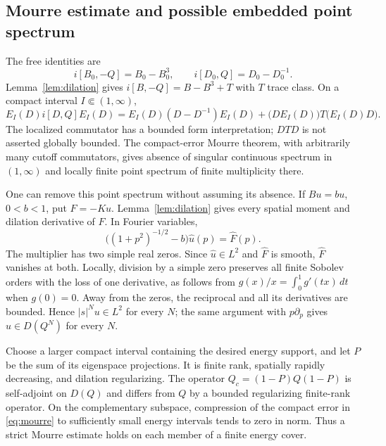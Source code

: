 \documentclass[11pt]{amsart}
\numberwithin{equation}{section}
\theoremstyle{remark}
\begin{document}
\subsection{Mourre estimate and possible embedded point spectrum}
The free identities are
\begin{equation}\label{eq:freecomm}
i[B_0,-Q]=B_0-B_0^3,\qquad i[D_0,Q]=D_0-D_0^{-1} .
\end{equation}
Lemma~\ref{lem:dilation} gives $i[B,-Q]=B-B^3+T$ with $T$ trace class. On a compact interval $I\Subset(1,\infty)$,
\begin{equation}\label{eq:mourre}
E_I(D)i[D,Q]E_I(D)=E_I(D)(D-D^{-1})E_I(D)+\big(DE_I(D)\big)T\big(E_I(D)D\big) .
\end{equation}
The localized commutator has a bounded form interpretation; $DTD$ is not asserted globally bounded. The compact-error Mourre theorem, with arbitrarily many cutoff commutators, gives absence of singular continuous spectrum in $(1,\infty)$ and locally finite point spectrum of finite multiplicity there.

One can remove this point spectrum without assuming its absence. If $Bu=bu$, $0<b<1$, put $F=-Ku$. Lemma~\ref{lem:dilation} gives every spatial moment and dilation derivative of $F$. In Fourier variables,
\begin{equation}\label{eq:eigeneq}
\big((1+p^2)^{-1/2}-b\big)\widehat u(p)=\widehat F(p) .
\end{equation}
The multiplier has two simple real zeros. Since $\widehat u\in L^2$ and $\widehat F$ is smooth, $\widehat F$ vanishes at both. Locally, division by a simple zero preserves all finite Sobolev orders with the loss of one derivative, as follows from $g(x)/x=\int_0^1g'(tx)\,dt$ when $g(0)=0$. Away from the zeros, the reciprocal and all its derivatives are bounded. Hence $|s|^Nu\in L^2$ for every $N$; the same argument with $p\partial_p$ gives $u\in D(Q^N)$ for every $N$.

Choose a larger compact interval containing the desired energy support, and let $P$ be the sum of its eigenspace projections. It is finite rank, spatially rapidly decreasing, and dilation regularizing. The operator $Q_c=(1-P)Q(1-P)$ is self-adjoint on $D(Q)$ and differs from $Q$ by a bounded regularizing finite-rank operator. On the complementary subspace, compression of the compact error in \eqref{eq:mourre} to sufficiently small energy intervals tends to zero in norm. Thus a strict Mourre estimate holds on each member of a finite energy cover.
\end{document}

